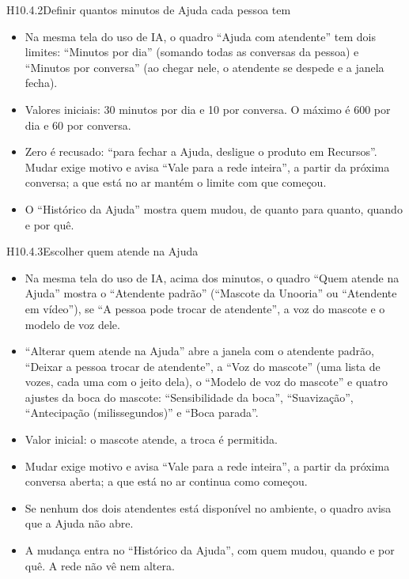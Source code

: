 \begin{historia}{H10.4.2}{Definir quantos minutos de Ajuda cada pessoa tem}{\pronto}
\aceite
\begin{itemize}
  \item Na mesma tela do uso de IA, o quadro \enquote{Ajuda com atendente}
    tem dois limites: \enquote{Minutos por dia} (somando todas as conversas da
    pessoa) e \enquote{Minutos por conversa} (ao chegar nele, o atendente se
    despede e a janela fecha).
  \item Valores iniciais: 30 minutos por dia e 10 por conversa. O máximo é 600
    por dia e 60 por conversa.
  \item Zero é recusado: \enquote{para fechar a Ajuda, desligue o produto em
    Recursos}. Mudar exige motivo e avisa \enquote{Vale para a rede inteira},
    a partir da próxima conversa; a que está no ar mantém o limite com que
    começou.
  \item O \enquote{Histórico da Ajuda} mostra quem mudou, de quanto para
    quanto, quando e por quê.
\end{itemize}
\end{historia}

\begin{historia}{H10.4.3}{Escolher quem atende na Ajuda}{\pronto}
\aceite
\begin{itemize}
  \item Na mesma tela do uso de IA, acima dos minutos, o quadro
    \enquote{Quem atende na Ajuda} mostra o \enquote{Atendente padrão}
    (\enquote{Mascote da Unooria} ou \enquote{Atendente em vídeo}), se
    \enquote{A pessoa pode trocar de atendente}, a voz do mascote e o modelo
    de voz dele.
  \item \enquote{Alterar quem atende na Ajuda} abre a janela com o atendente
    padrão, \enquote{Deixar a pessoa trocar de atendente}, a \enquote{Voz do
    mascote} (uma lista de vozes, cada uma com o jeito dela), o
    \enquote{Modelo de voz do mascote} e quatro ajustes da boca do mascote:
    \enquote{Sensibilidade da boca}, \enquote{Suavização},
    \enquote{Antecipação (milissegundos)} e \enquote{Boca parada}.
  \item Valor inicial: o mascote atende, a troca é permitida.
  \item Mudar exige motivo e avisa \enquote{Vale para a rede inteira}, a partir
    da próxima conversa aberta; a que está no ar continua como começou.
  \item Se nenhum dos dois atendentes está disponível no ambiente, o quadro
    avisa que a Ajuda não abre.
  \item A mudança entra no \enquote{Histórico da Ajuda}, com quem mudou,
    quando e por quê. A rede não vê nem altera.
\end{itemize}
\end{historia}

